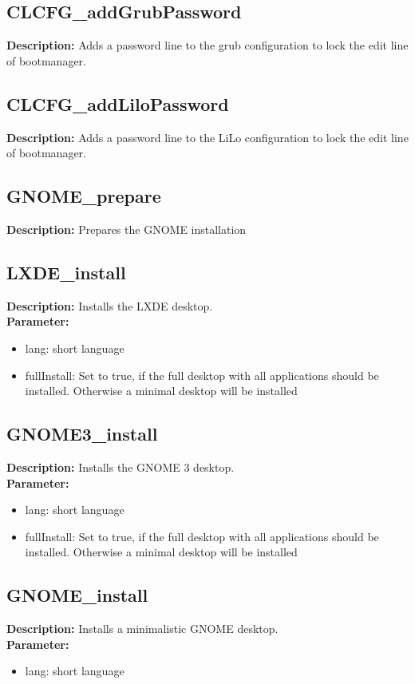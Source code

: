 \subsection{CLCFG\_addGrubPassword}
\textbf{Description:} Adds a password line to the grub configuration to lock the edit line of bootmanager.\\

\subsection{CLCFG\_addLiloPassword}
\textbf{Description:} Adds a password line to the LiLo configuration to lock the edit line of bootmanager.\\

\subsection{GNOME\_prepare}
\textbf{Description:} Prepares the GNOME installation\\

\subsection{LXDE\_install}
\textbf{Description:} Installs the LXDE desktop.\\
\textbf{Parameter:}
\begin{itemize}
\item lang: short language
\item fullInstall: Set to true, if the full desktop with all applications should be installed. Otherwise a minimal desktop will be installed
\end{itemize}

\subsection{GNOME3\_install}
\textbf{Description:} Installs the GNOME 3 desktop.\\
\textbf{Parameter:}
\begin{itemize}
\item lang: short language
\item fullInstall: Set to true, if the full desktop with all applications should be installed. Otherwise a minimal desktop will be installed
\end{itemize}

\subsection{GNOME\_install}
\textbf{Description:} Installs a minimalistic GNOME desktop.\\
\textbf{Parameter:}
\begin{itemize}
\item lang: short language
\end{itemize}

